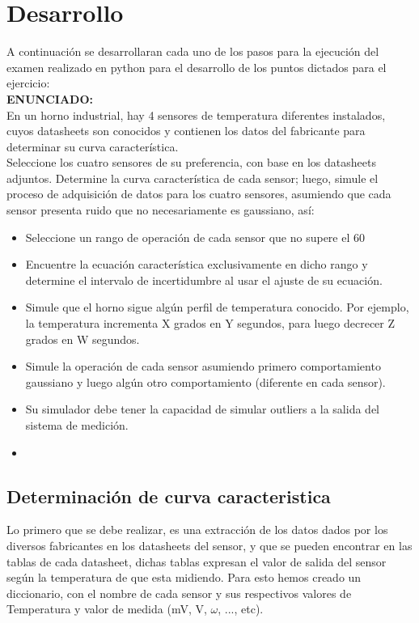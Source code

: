 \documentclass[conference]{IEEEtran}
\begin{document}
\section{Desarrollo}

A continuación se desarrollaran cada uno de los pasos para la ejecución del examen realizado en python para el desarrollo de los puntos dictados para el ejercicio:\\

\textbf{ENUNCIADO:}\\

En un horno industrial, hay 4 sensores de temperatura diferentes instalados, cuyos datasheets son conocidos y contienen los datos del fabricante para determinar su curva característica. \\

Seleccione los cuatro sensores de su preferencia, con base en los datasheets adjuntos. Determine la curva característica de cada sensor; luego, simule el proceso de adquisición de datos para los cuatro sensores, asumiendo que cada sensor presenta ruido que no necesariamente es gaussiano, así:\\

\begin{itemize}
	\item Seleccione un rango de operación de cada sensor que no supere el 60%
	\item Encuentre la ecuación característica exclusivamente en dicho rango y determine el intervalo de incertidumbre al usar el ajuste de su ecuación.
	\item Simule que el horno sigue algún perfil de temperatura conocido. Por ejemplo, la temperatura incrementa X grados en Y segundos, para luego decrecer Z grados en W segundos. 
	\item Simule la operación de cada sensor asumiendo primero comportamiento gaussiano y luego algún otro comportamiento (diferente en cada sensor).
	\item Su simulador debe tener la capacidad de simular outliers a la salida del sistema de medición. 
	\item 
\end{itemize}


\subsection{Determinación de curva caracteristica}

Lo primero que se debe realizar, es una extracción de los datos dados por los diversos fabricantes en los datasheets del sensor, y que se pueden encontrar en las tablas de cada datasheet, dichas tablas expresan el valor de salida del sensor según la temperatura de que esta midiendo. Para esto hemos creado un diccionario, con el nombre de cada sensor y sus respectivos valores de Temperatura y valor de medida (mV, V, $\omega$, ..., etc).\\
\end{document}
